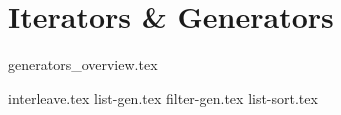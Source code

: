 \documentclass{exam}
\begin{document}
\newpage
\section{Iterators \& Generators}
{generators_overview.tex}
\begin{questions}
{interleave.tex}
\newpage
{list-gen.tex}
{filter-gen.tex}
\newpage
{list-sort.tex}
\end{questions}
\end{document}
